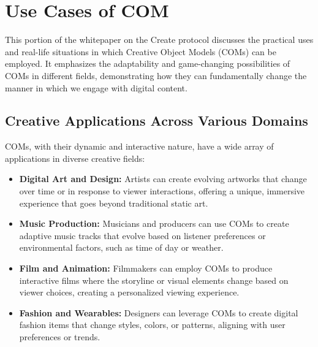 \documentclass[12pt,a4paper]{article}
\begin{document}
\noindent{}

\pagebreak

\section{Use Cases of COM}

This portion of the whitepaper on the Create protocol discusses the practical uses and real-life situations in which Creative Object Models (COMs) can be employed. It emphasizes the adaptability and game-changing possibilities of COMs in different fields, demonstrating how they can fundamentally change the manner in which we engage with digital content.

\subsection{Creative Applications Across Various Domains}

COMs, with their dynamic and interactive nature, have a wide array of applications in diverse creative fields:

\begin{itemize}
    \item \textbf{Digital Art and Design:} Artists can create evolving artworks that change over time or in response to viewer interactions, offering a unique, immersive experience that goes beyond traditional static art.
    \item \textbf{Music Production:} Musicians and producers can use COMs to create adaptive music tracks that evolve based on listener preferences or environmental factors, such as time of day or weather.
    \item \textbf{Film and Animation:} Filmmakers can employ COMs to produce interactive films where the storyline or visual elements change based on viewer choices, creating a personalized viewing experience.
    \item \textbf{Fashion and Wearables:} Designers can leverage COMs to create digital fashion items that change styles, colors, or patterns, aligning with user preferences or trends.
\end{itemize}
\end{document}
